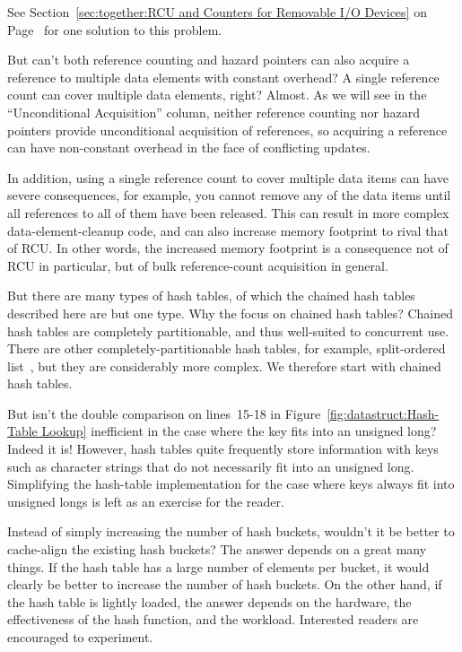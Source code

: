 	See
	Section~\ref{sec:together:RCU and Counters for Removable I/O Devices}
	on
	Page~\pageref{sec:together:RCU and Counters for Removable I/O Devices}
	for one solution to this problem.

\QuickQ{}
	But can't both reference counting and hazard pointers can also acquire
	a reference to multiple data elements with constant overhead?
	A single reference count can cover multiple data elements, right?
\QuickA{}
	Almost.
	As we will see in the ``Unconditional Acquisition'' column,
	neither reference counting
	nor hazard pointers provide unconditional acquisition of references,
	so acquiring a reference can have non-constant overhead in the face
	of conflicting updates.

	In addition, using a single reference count to cover multiple
	data items can have severe consequences, for example, you cannot
	remove any of the data items until all references to all of them
	have been released.
	This can result in more complex data-element-cleanup code,
	and can also increase memory footprint to rival that of RCU.
	In other words, the increased memory footprint is a consequence
	not of RCU in particular, but of bulk reference-count acquisition
	in general.

\QuickQ{}
	But there are many types of hash tables, of which the chained
	hash tables described here are but one type.
	Why the focus on chained hash tables?
\QuickA{}
	Chained hash tables are completely partitionable, and thus
	well-suited to concurrent use.
	There are other completely-partitionable hash tables, for
	example, split-ordered list~\cite{OriShalev2006SplitOrderListHash},
	but they are considerably more complex.
	We therefore start with chained hash tables.

\QuickQ{}
	But isn't the double comparison on lines~15-18 in
	Figure~\ref{fig:datastruct:Hash-Table Lookup} inefficient
	in the case where the key fits into an unsigned long?
\QuickA{}
	Indeed it is!
	However, hash tables quite frequently store information with
	keys such as character strings that do not necessarily fit
	into an unsigned long.
	Simplifying the hash-table implementation for the case where
	keys always fit into unsigned longs is left as an exercise
	for the reader.

\QuickQ{}
	Instead of simply increasing the number of hash buckets,
	wouldn't it be better to cache-align the existing hash buckets?
\QuickA{}
	The answer depends on a great many things.
	If the hash table has a large number of elements per bucket, it
	would clearly be better to increase the number of hash buckets.
	On the other hand, if the hash table is lightly loaded,
	the answer depends on the hardware, the effectiveness of the
	hash function, and the workload.
	Interested readers are encouraged to experiment.

